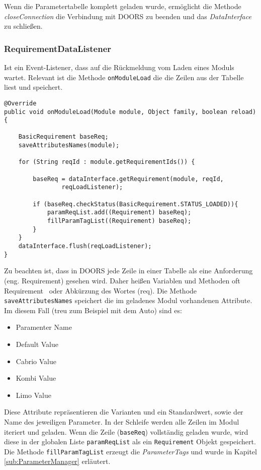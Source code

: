 Wenn die Parametertabelle komplett geladen wurde, ermöglicht die Methode \textit{closeConnection} die Verbindung mit DOORS zu beenden und das \textit{DataInterface} zu schließen.





\subsubsection{RequirementDataListener}\label{sub.RequirementDataListener}

Ist ein Event-Listener, dass auf die Rückmeldung vom Laden eines Moduls wartet. Relevant ist die Methode \texttt{onModuleLoad} die die Zeilen aus der Tabelle liest und speichert.\\

\begin{lstlisting}[caption={Laden der Parametertabelle nach Zeilen}, captionpos=b]
@Override
public void onModuleLoad(Module module, Object family, boolean reload){

	BasicRequirement baseReq;
	saveAttributesNames(module);
				
	for (String reqId : module.getRequirementIds()) {

		baseReq = dataInterface.getRequirement(module, reqId,
				reqLoadListener);

		if (baseReq.checkStatus(BasicRequirement.STATUS_LOADED)){
			paramReqList.add((Requirement) baseReq);
			fillParamTagList((Requirement) baseReq);
		}
	}
	dataInterface.flush(reqLoadListener);
}
\end{lstlisting}

Zu beachten ist, dass in DOORS jede Zeile in einer Tabelle als eine Anforderung (eng. Requirement) gesehen wird. Daher heißen Variablen und Methoden oft \glqq Requirement\grqq~ oder Abkürzung des Wortes (req). Die Methode \texttt{saveAttributesNames} speichert die im geladenes Modul vorhandenen Attribute. Im diesem Fall (treu zum Beispiel mit dem Auto) sind es:

\begin{itemize}\itemsep1pt
\item Paramenter Name
\item Default Value
\item Cabrio Value
\item Kombi Value
\item Limo Value
\end{itemize}

Diese Attribute repräsentieren die Varianten und ein Standardwert, sowie der Name des jeweiligen Parameter. In der Schleife werden alle Zeilen im Modul iteriert und geladen. Wenn die Zeile (\texttt{baseReq}) vollständig geladen wurde, wird diese in der globalen Liste \texttt{paramReqList} als ein \texttt{Requirement} Objekt gespeichert. Die Methode \texttt{fillParamTagList} erzeugt die \textit{ParameterTags} und wurde in Kapitel \ref{sub:ParameterManager} erläutert.\\

